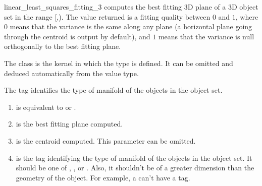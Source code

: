 \begin{ccRefFunction}{linear_least_squares_fitting_3}
{ computes the best fitting 3D plane of a 3D object set in the range
[,). The value returned is a fitting quality
between $0$ and $1$, where $0$ means that the variance is the same
along any plane (a horizontal plane going through the centroid is output
by default), and $1$ means that the variance is null orthogonally
to the best fitting plane. }

The class  is the kernel in which the type
 is defined. It can be omitted and
deduced automatically from the value type.

The tag  identifies the type of manifold of the objects in the object set.


\begin{enumerate}
   \item  {} is equivalent to  or .
   \item  {} is the best fitting plane computed.
   \item  {} is the centroid computed. This parameter can be
          omitted.
   \item  {} is the tag identifying the type of manifold of the objects in the object set. It should be one of , ,  or . Also, it shouldn't be of a greater dimension than the geometry of the object. For example, a  can't have a  tag.
\end{enumerate}

\end{ccRefFunction}

